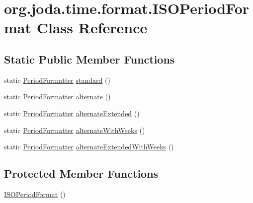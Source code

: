 \hypertarget{classorg_1_1joda_1_1time_1_1format_1_1_i_s_o_period_format}{\section{org.\-joda.\-time.\-format.\-I\-S\-O\-Period\-Format Class Reference}
\label{classorg_1_1joda_1_1time_1_1format_1_1_i_s_o_period_format}
}
\subsection*{Static Public Member Functions}
\begin{DoxyCompactItemize}
\item 
static \hyperlink{classorg_1_1joda_1_1time_1_1format_1_1_period_formatter}{Period\-Formatter} \hyperlink{classorg_1_1joda_1_1time_1_1format_1_1_i_s_o_period_format_ac069039b02ea00504f00e377f4a238be}{standard} ()
\item 
static \hyperlink{classorg_1_1joda_1_1time_1_1format_1_1_period_formatter}{Period\-Formatter} \hyperlink{classorg_1_1joda_1_1time_1_1format_1_1_i_s_o_period_format_ac8e7a4417c9555ccc6acfd8b0b3decb2}{alternate} ()
\item 
static \hyperlink{classorg_1_1joda_1_1time_1_1format_1_1_period_formatter}{Period\-Formatter} \hyperlink{classorg_1_1joda_1_1time_1_1format_1_1_i_s_o_period_format_a142b1be487303ab2971d0a0a4e2674ad}{alternate\-Extended} ()
\item 
static \hyperlink{classorg_1_1joda_1_1time_1_1format_1_1_period_formatter}{Period\-Formatter} \hyperlink{classorg_1_1joda_1_1time_1_1format_1_1_i_s_o_period_format_ae156950cbcdd0f4c23057b8d69a4c201}{alternate\-With\-Weeks} ()
\item 
static \hyperlink{classorg_1_1joda_1_1time_1_1format_1_1_period_formatter}{Period\-Formatter} \hyperlink{classorg_1_1joda_1_1time_1_1format_1_1_i_s_o_period_format_a9ec70fc105cee9e15b9f5b93ec2f4825}{alternate\-Extended\-With\-Weeks} ()
\end{DoxyCompactItemize}
\subsection*{Protected Member Functions}
\begin{DoxyCompactItemize}
\item 
\hyperlink{classorg_1_1joda_1_1time_1_1format_1_1_i_s_o_period_format_a127999917a3168edfc66a60352f9e1e3}{I\-S\-O\-Period\-Format} ()
\end{DoxyCompactItemize}


